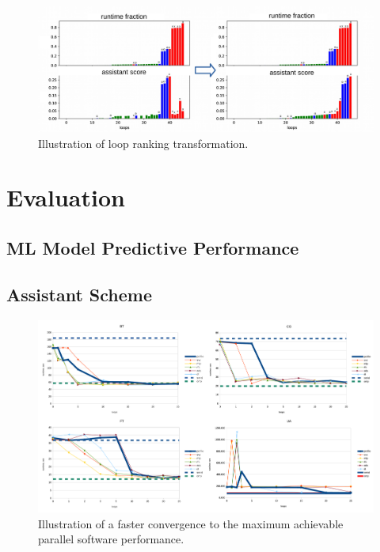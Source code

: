 \documentclass{acaces}
\begin{document}
\begin{figure}
\centering
\includegraphics[width=1.0\textwidth]{ft_ranking}
\caption{Illustration of loop ranking transformation.}
\label{logo}
\end{figure}


\section{Evaluation}

\subsection{ML Model Predictive Performance}


\subsection{Assistant Scheme}

\begin{figure}
\centering
\includegraphics[width=1.0\textwidth]{parallelisation_acceleration}
\caption{Illustration of a faster convergence to the maximum achievable parallel software performance.}
\label{logo}
\end{figure}


\end{document}
